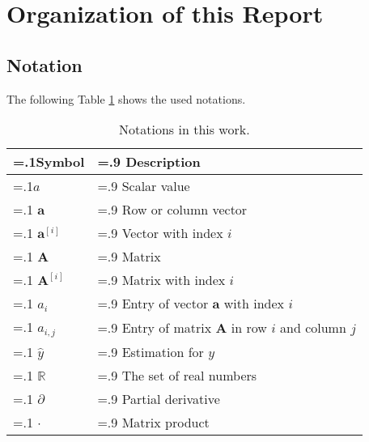 \newline

\section{Organization of this Report}
\subsection{Notation}
The following Table \ref{tab:notation} shows the used notations.

\begin{table}[H]
\centering
\caption{Notations in this work.\label{tab:notation}}
\begin{tabularx}{\textwidth}{|
 >{\hsize=.1\hsize}X |
 >{\hsize=.9\hsize}X |
}
\hline
\textbf{Symbol} & \textbf{Description} \\ \hline
$a$ & Scalar value \\ \hline 
$\mathbf{a}$ & Row or column vector \\ \hline
$\mathbf{a}^{[i]}$ & Vector with index $i$  \\ \hline
$\mathbf{A}$ & Matrix \\ \hline 
$\mathbf{A}^{[i]}$ & Matrix with index $i$ \\ \hline 
$a_i$ & Entry of vector $\mathbf{a}$ with index $i$ \\ \hline 
$a_{i,j}$ & Entry of matrix $\mathbf{A}$ in row $i$ and column $j$ \\ \hline
$\hat{y}$ & Estimation for $y$ \\ \hline 
$\mathbb{R}$ & The set of real numbers \\ \hline
$\partial$ & Partial derivative \\ \hline
$\cdot$ & Matrix product \\ \hline
\end{tabularx}
\end{table}
